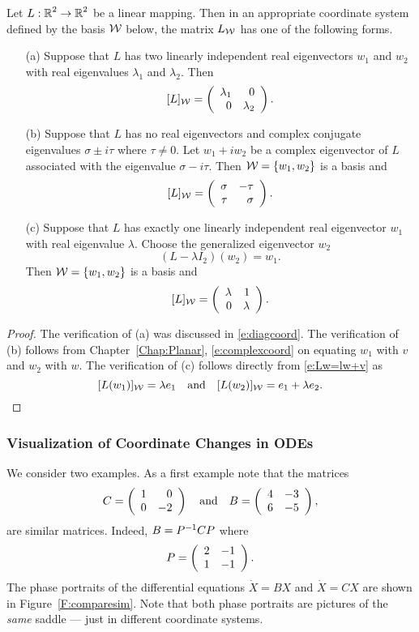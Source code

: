 \documentclass{ximera}
\begin{document}
\begin{theorem}  \label{T:putinform2}
Let $L:\mbox{$\Bbb{R}$}^2\to\mbox{$\Bbb{R}$}^2$ be a linear mapping.  Then in an appropriate
coordinate system defined by the basis ${\cal W}$ below, the matrix
$L_{\cal W}$ has one of the following forms.
\begin{itemize}
\item[(a)]	Suppose that $L$ has two linearly independent
real eigenvectors $w_1$ and $w_2$ with real eigenvalues $\lambda_1$
and $\lambda_2$.  Then
\[
[L]_{\cal W} = \left(\begin{array}{rr} \lambda_1 & 0\\ 0 &\lambda_2\end{array}\right).
\]

\item[(b)]	Suppose that $L$ has no real eigenvectors and
complex conjugate eigenvalues $\sigma\pm i\tau$ where
$\tau\neq 0$.  Let $w_1+iw_2$ be a complex eigenvector of $L$
associated with the eigenvalue $\sigma-i\tau$.
Then ${\cal W}=\{w_1,w_2\}$ is a basis and
\[
[L]_{\cal W} = \left(\begin{array}{rr} \sigma & -\tau\\ \tau &\sigma\end{array}\right).
\]

\item[(c)]	Suppose that $L$ has exactly one linearly
independent real eigenvector $w_1$ with real eigenvalue $\lambda$.
Choose the generalized eigenvector $w_2$
\begin{equation}  \label{e:Lw=lw+v}
(L-\lambda I_2)(w_2) =  w_1.
\end{equation}
Then ${\cal W}=\{w_1,w_2\}$ is a basis and
\[
[L]_{\cal W} = \left(\begin{array}{rr} \lambda & 1\\ 0 &\lambda\end{array}\right).
\]
\end{itemize}
\end{theorem}

\begin{proof}
The verification of (a) was discussed in \eqref{e:diagcoord}.  The
verification of (b) follows from Chapter~\ref{Chap:Planar},
\eqref{e:complexcoord} on equating $w_1$ with $v$ and $w_2$ with $w$.
The verification of (c) follows directly from \eqref{e:Lw=lw+v} as
\[
[L(w_1)]_{\cal W} = \lambda e_1 \quad\mbox{and}\quad [L(w_2)]_{\cal W} = e_1+\lambda e_2.
\]
\end{proof}



\subsubsection*{Visualization of Coordinate Changes in ODEs}

We consider two examples.  As a first example note that the matrices
\[
C = \left(\begin{array}{rr} 1 & 0\\ 0 &-2\end{array}\right) \quad\mbox{and}\quad B = \left(\begin{array}{rr} 4 & -3\\ 6 &-5\end{array}\right),
\]
are similar matrices.   Indeed, $B = P^{-1} CP$ where
\begin{equation}  \label{e:Pchange}
P = \left(\begin{array}{rr} 2 & -1\\ 1 &-1\end{array}\right).
\end{equation}
The phase portraits of the differential equations $\dot{X}=BX$ and
$\dot{X}=CX$ are shown in Figure~\ref{F:comparesim}.  Note that both
phase portraits are pictures of the {\em same\/} saddle ---
just in different coordinate systems.
\end{document}
